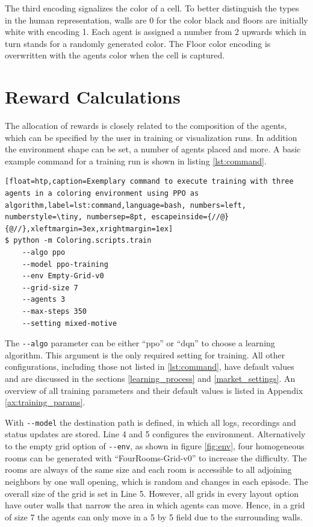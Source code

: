 The third encoding signalizes the color of a cell. To better distinguish the types in the human representation, walls are 0 for the color black and floors are initially white with encoding 1. Each agent is assigned a number from 2 upwards which in turn stands for a randomly generated color. The Floor color encoding is overwritten with the agents color when the cell is captured.

\section{Reward Calculations}
The allocation of rewards is closely related to the composition of the agents, which can be specified by the user in training or visualization runs. In addition the environment shape can be set, a number of agents placed and more. A basic example command for a training run is shown in listing \ref{lst:command}.

\begin{lstlisting}[float=htp,caption=Exemplary command to execute training with three agents in a coloring environment using PPO as algorithm,label=lst:command,language=bash, numbers=left, numberstyle=\tiny, numbersep=8pt, escapeinside={//@}{@//},xleftmargin=3ex,xrightmargin=1ex]
$ python -m Coloring.scripts.train
    --algo ppo
    --model ppo-training
    --env Empty-Grid-v0 
    --grid-size 7
    --agents 3 
    --max-steps 350
    --setting mixed-motive
\end{lstlisting}

The \verb|--algo| parameter can be either ``ppo'' or ``dqn'' to choose a learning algorithm. This argument is the only required setting for training. All other configurations, including those not listed in \ref{lst:command}, have default values and are discussed in the sections \ref{learning_process} and \ref{market_settings}. An overview of all training parameters and their default values is listed in Appendix \ref{ax:training_params}.

With \verb|--model| the destination path is defined, in which all logs, recordings and status updates are stored. Line 4 and 5 configures the environment. Alternatively to the empty grid option of \verb|--env|, as shown in figure \ref{fig:env}, four homogeneous rooms can be generated with ``FourRooms-Grid-v0'' to increase the difficulty. The rooms are always of the same size and each room is accessible to all adjoining neighbors by one wall opening, which is random and changes in each episode. The overall size of the grid is set in Line 5. However, all grids in every layout option have outer walls that narrow the area in which agents can move. Hence, in a grid of size 7 the agents can only move in a 5 by 5 field due to the surrounding walls.

